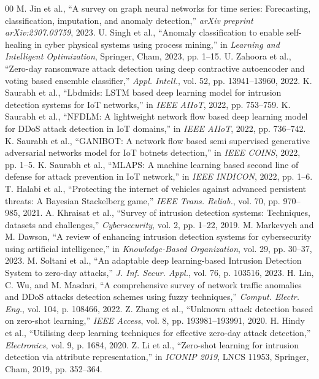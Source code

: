 \documentclass[twocolumn]{article}
\begin{document}
\begin{thebibliography}{00}
 M. Jin et al., ``A survey on graph neural networks for time series: Forecasting, classification, imputation, and anomaly detection,'' \textit{arXiv preprint arXiv:2307.03759}, 2023.
 U. Singh et al., ``Anomaly classification to enable self-healing in cyber physical systems using process mining,'' in \textit{Learning and Intelligent Optimization}, Springer, Cham, 2023, pp. 1--15.
 U. Zahoora et al., ``Zero-day ransomware attack detection using deep contractive autoencoder and voting based ensemble classifier,'' \textit{Appl. Intell.}, vol. 52, pp. 13941--13960, 2022.
 K. Saurabh et al., ``Lbdmids: LSTM based deep learning model for intrusion detection systems for IoT networks,'' in \textit{IEEE AIIoT}, 2022, pp. 753--759.
 K. Saurabh et al., ``NFDLM: A lightweight network flow based deep learning model for DDoS attack detection in IoT domains,'' in \textit{IEEE AIIoT}, 2022, pp. 736--742.
 K. Saurabh et al., ``GANIBOT: A network flow based semi supervised generative adversarial networks model for IoT botnets detection,'' in \textit{IEEE COINS}, 2022, pp. 1--5.
 K. Saurabh et al., ``MLAPS: A machine learning based second line of defense for attack prevention in IoT network,'' in \textit{IEEE INDICON}, 2022, pp. 1--6.
 T. Halabi et al., ``Protecting the internet of vehicles against advanced persistent threats: A Bayesian Stackelberg game,'' \textit{IEEE Trans. Reliab.}, vol. 70, pp. 970--985, 2021.
 A. Khraisat et al., ``Survey of intrusion detection systems: Techniques, datasets and challenges,'' \textit{Cybersecurity}, vol. 2, pp. 1--22, 2019.
 M. Markevych and M. Dawson, ``A review of enhancing intrusion detection systems for cybersecurity using artificial intelligence,'' in \textit{Knowledge-Based Organization}, vol. 29, pp. 30--37, 2023.
 M. Soltani et al., ``An adaptable deep learning-based Intrusion Detection System to zero-day attacks,'' \textit{J. Inf. Secur. Appl.}, vol. 76, p. 103516, 2023.
 H. Lin, C. Wu, and M. Masdari, ``A comprehensive survey of network traffic anomalies and DDoS attacks detection schemes using fuzzy techniques,'' \textit{Comput. Electr. Eng.}, vol. 104, p. 108466, 2022.
 Z. Zhang et al., ``Unknown attack detection based on zero-shot learning,'' \textit{IEEE Access}, vol. 8, pp. 193981--193991, 2020.
 H. Hindy et al., ``Utilising deep learning techniques for effective zero-day attack detection,'' \textit{Electronics}, vol. 9, p. 1684, 2020.
 Z. Li et al., ``Zero-shot learning for intrusion detection via attribute representation,'' in \textit{ICONIP 2019}, LNCS 11953, Springer, Cham, 2019, pp. 352--364.

\end{thebibliography}
\end{document}
